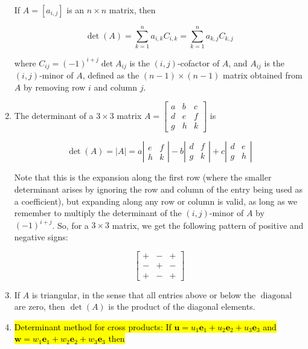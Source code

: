 \documentclass[10pt]{article}
\begin{document}
\begin{enumerate}
If $A=\left[a_{i, j}\right]$ is an $n \times n$ matrix, then

$$
\operatorname{det}(A)=\sum_{k=1}^{n} a_{i, k} C_{i, k}=\sum_{k=1}^{n} a_{k, j} C_{k, j}
$$

where $C_{i j}=(-1)^{i+j} \operatorname{det} A_{i j}$ is the $(i, j)$-cofactor of $A$, and $A_{i j}$ is the $(i, j)$-minor of $A$, defined as the $(n-1) \times(n-1)$ matrix obtained from $A$ by removing row $i$ and column $j$.

\item The determinant of a $3 \times 3$ matrix $A=\left[\begin{array}{lll}a & b & c \\ d & e & f \\ g & h & k\end{array}\right]$ is

$$
\operatorname{det}(A)=|A|=a\left|\begin{array}{ll}
e & f \\
h & k
\end{array}\right|-b\left|\begin{array}{ll}
d & f \\
g & k
\end{array}\right|+c\left|\begin{array}{ll}
d & e \\
g & h
\end{array}\right|
$$

Note that this is the expansion along the first row (where the smaller determinant arises by ignoring the row and column of the entry being used as a coefficient), but expanding along any row or column is valid, as long as we remember to multiply the determinant of the $(i, j)$-minor of $A$ by $(-1)^{i+j}$. So, for a $3 \times 3$ matrix, we get the following pattern of positive and negative signs:

$$
\left[\begin{array}{lll}
+ & - & + \\
- & + & - \\
+ & - & +
\end{array}\right]
$$

\item If $A$ is triangular, in the sense that all entries above or below the $\operatorname{diagonal}$ are zero, then $\operatorname{det}(A)$ is the product of the diagonal elements.

\item \hl{Determinant method for cross products: If $\mathbf{u}=u_{1} \mathbf{e}_{1}+u_{2} \mathbf{e}_{2}+u_{3} \mathbf{e}_{3}$ and $\mathbf{w}=w_{1} \mathbf{e}_{1}+w_{2} \mathbf{e}_{2}+w_{3} \mathbf{e}_{3}$ then}


\end{enumerate}
\end{document}
